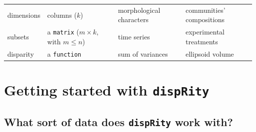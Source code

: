 \documentclass[]{book}
\theoremstyle{definition}
\theoremstyle{definition}
\theoremstyle{remark}
\begin{document}
\begin{longtable}[]{@{}llll@{}}
\begin{minipage}[t]{0.20\columnwidth}
dimensions\strut
\end{minipage} & \begin{minipage}[t]{0.20\columnwidth}\raggedright\strut
columns (\(k\))\strut
\end{minipage} & \begin{minipage}[t]{0.23\columnwidth}\raggedright\strut
morphological characters\strut
\end{minipage} & \begin{minipage}[t]{0.17\columnwidth}\raggedright\strut
communities' compositions\strut
\end{minipage}\tabularnewline
\begin{minipage}[t]{0.20\columnwidth}\raggedright\strut
subsets\strut
\end{minipage} & \begin{minipage}[t]{0.20\columnwidth}\raggedright\strut
a \texttt{matrix} (\(m \times k\), with \(m \leq n\))\strut
\end{minipage} & \begin{minipage}[t]{0.23\columnwidth}\raggedright\strut
time series\strut
\end{minipage} & \begin{minipage}[t]{0.17\columnwidth}\raggedright\strut
experimental treatments\strut
\end{minipage}\tabularnewline
\begin{minipage}[t]{0.20\columnwidth}\raggedright\strut
disparity\strut
\end{minipage} & \begin{minipage}[t]{0.20\columnwidth}\raggedright\strut
a \texttt{function}\strut
\end{minipage} & \begin{minipage}[t]{0.23\columnwidth}\raggedright\strut
sum of variances\strut
\end{minipage} & \begin{minipage}[t]{0.17\columnwidth}\raggedright\strut
ellipsoid volume\strut
\end{minipage}\tabularnewline
\bottomrule
\end{longtable}

\chapter{\texorpdfstring{Getting started with
\texttt{dispRity}}{Getting started with dispRity}}\label{getting-started-with-disprity}

\section{\texorpdfstring{What sort of data does \texttt{dispRity} work
with?}{What sort of data does dispRity work with?}}\label{what-sort-of-data-does-disprity-work-with}
\end{document}
